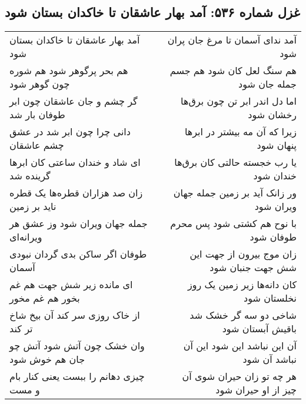 \begin{center}
\section*{غزل شماره ۵۳۶: آمد بهار عاشقان تا خاکدان بستان شود}
\label{sec:0536}
\begin{longtable}{l p{0.5cm} r}
آمد بهار عاشقان تا خاکدان بستان شود
&&
آمد ندای آسمان تا مرغ جان پران شود
\\
هم بحر پرگوهر شود هم شوره چون گوهر شود
&&
هم سنگ لعل کان شود هم جسم جمله جان شود
\\
گر چشم و جان عاشقان چون ابر طوفان بار شد
&&
اما دل اندر ابر تن چون برق‌ها رخشان شود
\\
دانی چرا چون ابر شد در عشق چشم عاشقان
&&
زیرا که آن مه بیشتر در ابرها پنهان شود
\\
ای شاد و خندان ساعتی کان ابرها گرینده شد
&&
یا رب خجسته حالتی کان برق‌ها خندان شود
\\
زان صد هزاران قطره‌ها یک قطره ناید بر زمین
&&
ور زانک آید بر زمین جمله جهان ویران شود
\\
جمله جهان ویران شود وز عشق هر ویرانه‌ای
&&
با نوح هم کشتی شود پس محرم طوفان شود
\\
طوفان اگر ساکن بدی گردان نبودی آسمان
&&
زان موج بیرون از جهت این شش جهت جنبان شود
\\
ای مانده زیر شش جهت هم غم بخور هم غم مخور
&&
کان دانه‌ها زیر زمین یک روز نخلستان شود
\\
از خاک روزی سر کند آن بیخ شاخ تر کند
&&
شاخی دو سه گر خشک شد باقیش آبستان شود
\\
وان خشک چون آتش شود آتش چو جان هم خوش شود
&&
آن این نباشد این شود این آن نباشد آن شود
\\
چیزی دهانم را ببست یعنی کنار بام و مست
&&
هر چه تو زان حیران شوی آن چیز از او حیران شود
\\
\end{longtable}
\end{center}
